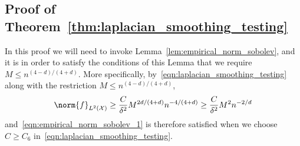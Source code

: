 \documentclass[twoside]{article}
\newcommand{\1}{\mathbf{1}}
\newcommand{\Xset}{\mathcal{X}}
\newcommand{\Leb}{L}
\theoremstyle{definition}
\theoremstyle{remark}
\begin{document}
\subsection{Proof of Theorem~\ref{thm:laplacian_smoothing_testing}}
In this proof we will need to invoke Lemma~\ref{lem:empirical_norm_sobolev}, and it is in order to satisfy the conditions of this Lemma that we require $M \leq n^{(4 - d)/(4 + d)}$. More specifically, by~\eqref{eqn:laplacian_smoothing_testing} along with the restriction $M \leq n^{(4 - d)/(4 + d)}$,
\begin{equation*}
\norm{f}_{\Leb^2(\Xset)} \geq \frac{C}{\delta^2} M^{2d/(4 + d)} n^{-4/(4 + d)} \geq \frac{C}{\delta^2} M^2 n^{-2/d}
\end{equation*}
and~\eqref{eqn:empirical_norm_sobolev_1} is therefore satisfied when we choose $C \geq C_6$ in~\eqref{eqn:laplacian_smoothing_testing}.
\end{document}
